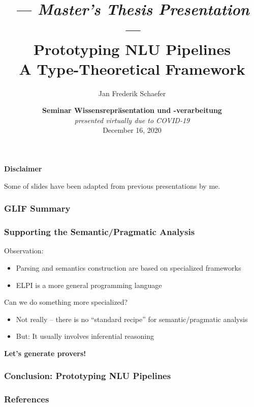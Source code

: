 \documentclass[aspectratio=169]{beamer}
\title{{\footnotesize\itshape --- Master's Thesis Presentation ---}\\[1pt] Prototyping NLU Pipelines\\[3pt] \normalsize A Type-Theoretical Framework}
\author{Jan Frederik Schaefer}
\institute{FAU Erlangen-N\"urnberg}
\date{\textbf{Seminar Wissensrepr\"asentation und -verarbeitung} \\ \textit{presented virtually due to COVID-19} \\ December 16, 2020 }
\begin{document}
\frame\titlepage

\begin{frame}
    \centering
    \textbf{Disclaimer}

    \vspace{1em}
    Some of slides have been adapted from previous presentations by me.
\end{frame}






{
    
}






\begin{frame}
    \frametitle{GLIF Summary}
    
\end{frame}

\begin{frame}
    \frametitle{Supporting the Semantic/Pragmatic Analysis}
    Observation:
    \begin{itemize}
        \item Parsing and semantics construction are based on specialized frameworks
        \item ELPI is a more general programming language
    \end{itemize}
    
    \vspace{1em}
    Can we do something more specialized?
    \begin{itemize}
        \item Not really -- there is no ``standard recipe'' for
            semantic/pragmatic analysis
        \item But: It usually involves inferential reasoning
    \end{itemize}

    \vspace{2em}
    \centering
    \bfseries Let's generate provers!\par
\end{frame}



\begin{frame}
    \frametitle{Conclusion: Prototyping NLU Pipelines}
    
\end{frame}

\appendix

\begin{frame}[allowframebreaks,t]
    \frametitle{References}
    \printbibliography
\end{frame}
\end{document}
